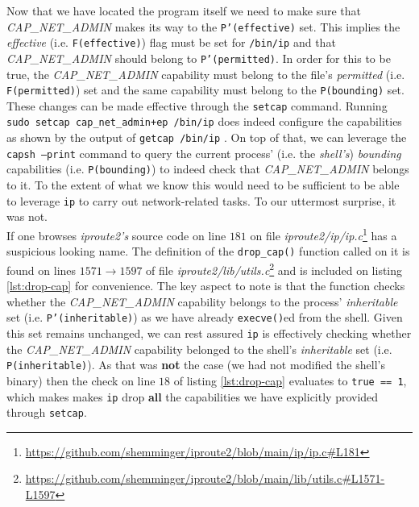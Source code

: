         Now that we have located the program itself we need to make sure that \textit{CAP\_NET\_ADMIN} makes its way to the \texttt{P'(effective)} set. This implies the \textit{effective} (i.e. \texttt{F(effective)}) flag must be set for \texttt{/bin/ip} and that \textit{CAP\_NET\_ADMIN} should belong to \texttt{P'(permitted)}. In order for this to be true, the \textit{CAP\_NET\_ADMIN} capability must belong to the file's \textit{permitted} (i.e. \texttt{F(permitted)}) set and the same capability must belong to the \texttt{P(bounding)} set.\\

        These changes can be made effective through the \texttt{setcap} \cite{bib:man-setcap} command. Running \texttt{sudo setcap cap\_net\_admin+ep /bin/ip} does indeed configure the capabilities as shown by the output of \texttt{getcap /bin/ip} \cite{bib:man-getcap}. On top of that, we can leverage the \texttt{capsh --print} \cite{bib:man-capsh} command to query the current process' (i.e. the \textit{shell's}) \textit{bounding} capabilities (i.e. \texttt{P(bounding)}) to indeed check that \textit{CAP\_NET\_ADMIN} belongs to it. To the extent of what we know this would need to be sufficient to be able to leverage \texttt{ip} to carry out network-related tasks. To our uttermost surprise, it was not.\\

        If one browses \textit{iproute2's} source code on \cite{bib:iproute2-src} line $181$ on file \textit{iproute2/ip/ip.c}\footnote{\url{https://github.com/shemminger/iproute2/blob/main/ip/ip.c\#L181}} has a suspicious looking name. The definition of the \texttt{drop\_cap()} function called on it is found on lines $1571 \to 1597$ of file \textit{iproute2/lib/utils.c}\footnote{\url{https://github.com/shemminger/iproute2/blob/main/lib/utils.c\#L1571-L1597}} and is included on listing \ref{lst:drop-cap} for convenience. The key aspect to note is that the function checks whether the \textit{CAP\_NET\_ADMIN} capability belongs to the process' \textit{inheritable} set (i.e. \texttt{P'(inheritable)}) as we have already \texttt{execve()}ed from the shell. Given this set remains unchanged, we can rest assured \texttt{ip} is effectively checking whether the \textit{CAP\_NET\_ADMIN} capability belonged to the shell's \textit{inheritable} set (i.e. \texttt{P(inheritable)}). As that was \textbf{not} the case (we had not modified the shell's binary) then the check on line $18$ of listing \ref{lst:drop-cap} evaluates to \texttt{true == 1}, which makes makes \texttt{ip} drop \textbf{all} the capabilities we have explicitly provided through \texttt{setcap}.\\

